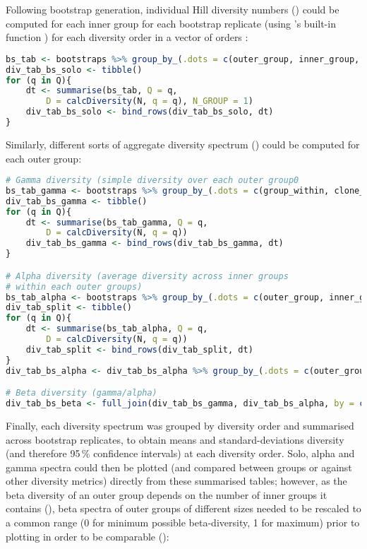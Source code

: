 \noindent Following bootstrap generation, individual Hill diversity numbers () could be computed for each inner group for each bootstrap replicate (using 's built-in  function \parencite{gupta2015changeo,stern2014bcells}) for each diversity order in a vector of orders :

\begin{lstlisting}[language=R]
bs_tab <- bootstraps %>% group_by_(.dots = c(outer_group, inner_group, "ITER"))
div_tab_bs_solo <- tibble()
for (q in Q){
	dt <- summarise(bs_tab, Q = q, 
		D = calcDiversity(N, q = q), N_GROUP = 1)
	div_tab_bs_solo <- bind_rows(div_tab_bs_solo, dt)
}
\end{lstlisting}

\noindent Similarly, different sorts of aggregate diversity spectrum () could be computed for each outer group:

\begin{lstlisting}[language=R]
# Gamma diversity (simple diversity over each outer group0
bs_tab_gamma <- bootstraps %>% group_by_(.dots = c(group_within, clone_field, "ITER")) %>% summarise(N = sum(N)) %>% group_by_(.dots = c(outer_group, "ITER"))
div_tab_bs_gamma <- tibble()
for (q in Q){
	dt <- summarise(bs_tab_gamma, Q = q,
		D = calcDiversity(N, q = q))
	div_tab_bs_gamma <- bind_rows(div_tab_bs_gamma, dt)
}

# Alpha diversity (average diversity across inner groups
# within each outer groups)
bs_tab_alpha <- bootstraps %>% group_by_(.dots = c(outer_group, inner_group, "ITER"))
div_tab_split <- tibble()
for (q in Q){
	dt <- summarise(bs_tab_alpha, Q = q,
		D = calcDiversity(N, q = q))
	div_tab_split <- bind_rows(div_tab_split, dt)
}
div_tab_bs_alpha <- div_tab_bs_alpha %>% group_by_(.dots = c(outer_group, "ITER", "Q")) %>% summarise(D = ifelse(dplyr::first(Q) != 1, mean(D^(1-dplyr::first(Q)))^(1/(1-dplyr::first(Q))),  exp(mean(log(D)))), N_GROUP = n())

# Beta diversity (gamma/alpha)
div_tab_bs_beta <- full_join(div_tab_bs_gamma, div_tab_bs_alpha, by = c(outer_group, "ITER", "Q"), suffix = c("_GAMMA", "_ALPHA")) %>% mutate(D= D_GAMMA/D_ALPHA) %>% select(-D_GAMMA, -D_ALPHA)
\end{lstlisting}

\noindent Finally, each diversity spectrum was grouped by diversity order and summarised across bootstrap replicates, to obtain means and standard-deviations diversity (and therefore 95\,\% confidence intervals) at each diversity order. Solo, alpha and gamma spectra could then be plotted (and compared between groups or against other diversity metrics) directly from these summarised tables; however, as the beta diversity of an outer group depends on the number of inner groups it contains (), beta spectra of outer groups of different sizes needed to be rescaled to a common range (0 for minimum possible beta-diversity, 1 for maximum) prior to plotting in order to be comparable ():

